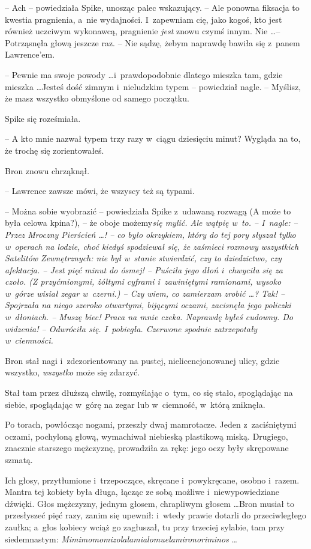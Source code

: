 \documentclass[oneside,polish,11pt,rmheadings]{mwbk}
\begin{document}
-- Ach -- powiedziała Spike, unosząc palec wskazujący. -- Ale ponowna fiksacja to kwestia pragnienia, a~nie wydajności. I~zapewniam cię, jako kogoś, kto jest również uczciwym wykonawcą, pragnienie \textit{jest }znowu czymś innym. Nie \ldots  -- Potrząsnęła głową jeszcze raz. -- Nie sądzę, żebym naprawdę bawiła się z~panem Lawrence'em. 

-- Pewnie ma swoje powody \ldots  i~prawdopodobnie dlatego mieszka tam, gdzie mieszka \ldots  Jesteś dość zimnym i~nieludzkim typem -- powiedział nagle. -- Myślisz, że masz wszystko obmyślone od samego początku. 

Spike się roześmiała. 

-- A kto mnie nazwał typem trzy razy w~ciągu dziesięciu minut? Wygląda na to, że trochę się zorientowałeś. 

Bron znowu chrząknął. 

-- Lawrence zawsze mówi, że wszyscy też są typami. 

-- Można sobie wyobrazić -- powiedziała Spike z~udawaną rozwagą (A może to była celowa kpina?), -- że oboje możemy\textit{się mylić.  Ale wątpię w~to. -- I~nagle: -- Przez Mroczny Pierścień \ldots ! -- co było okrzykiem, który do tej pory słyszał tylko w~operach na lodzie, choć kiedyś spodziewał się, że zaśmieci rozmowy wszystkich Satelitów Zewnętrznych: nie był w~stanie stwierdzić, czy to dziedzictwo, czy afektacja. -- Jest pięć minut do ósmej! -- Puściła jego dłoń i~chwyciła się za czoło. (Z przyćmionymi, żółtymi cyframi i~zawiniętymi ramionami, wysoko w~górze wisiał zegar w~czerni.) -- Czy wiem, co zamierzam zrobić \ldots  ? Tak! -- Spojrzała na niego szeroko otwartymi, bijącymi oczami, zacisnęła jego policzki w~dłoniach. -- Muszę biec! Praca na mnie czeka. Naprawdę byłeś cudowny. Do widzenia! -- Odwróciła się. I~pobiegła. Czerwone spodnie zatrzepotały w~ciemności.} 

Bron stał nagi i~zdezorientowany na pustej, nielicencjonowanej ulicy, gdzie wszystko, \textit{wszystko } może się zdarzyć. 

Stał tam przez dłuższą chwilę, rozmyślając o~tym, co się stało, spoglądając na siebie, spoglądając w~górę na zegar lub w~ciemność, w~którą zniknęła. 

Po torach, powłócząc nogami, przeszły dwaj mamrotacze. Jeden z~zaciśniętymi oczami, pochyloną głową, wymachiwał niebieską plastikową miską. Drugiego, znacznie starszego mężczyznę, prowadziła za rękę: jego oczy były skrępowane szmatą. 

Ich głosy, przytłumione i~trzepoczące, skręcane i~powykręcane, osobno i~razem. Mantra tej kobiety była długa, łącząc ze sobą możliwe i~niewypowiedziane dźwięki. Głos mężczyzny, jednym głosem, chrapliwym głosem \ldots   Bron musiał to przesłyszeć pięć razy, zanim się upewnił: i~wtedy prawie dotarli do przeciwległego zaułka; a~głos kobiecy wciąż go zagłuszał, tu przy trzeciej sylabie, tam przy siedemnastym: 
\textit{Mimimomomizolalamialomuelamironoriminos } \ldots  
\end{document}
